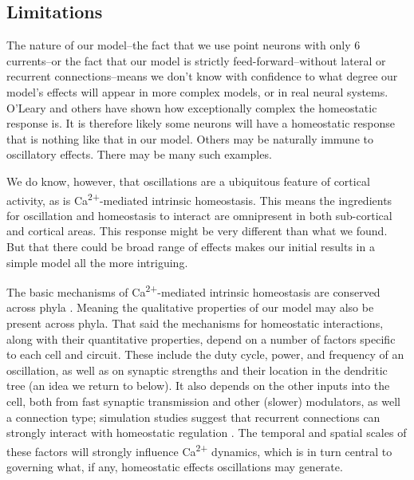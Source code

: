 \documentclass{article}
\begin{document}
\subsection*{Limitations}
The nature of our model--the fact that we use point neurons with only 6 currents--or the fact that our model is strictly feed-forward--without lateral or recurrent connections--means we don't know with confidence to what degree our model's effects will appear in more complex models, or in real neural systems. O'Leary \citep{OLeary2014} and others have shown how exceptionally complex the homeostatic response is. It is therefore likely some neurons will have a homeostatic response that is nothing like that in our model. Others may be naturally immune to oscillatory effects. There may be many such examples.

We do know, however, that oscillations are a ubiquitous feature of cortical activity, as is Ca\textsuperscript{2+}-mediated intrinsic homeostasis. This means the ingredients for oscillation and homeostasis to interact are omnipresent in both sub-cortical and cortical areas. This response might be very different than what we found. But that there could be broad range of effects makes our initial results in a simple model all the more intriguing. 

The basic mechanisms of Ca\textsuperscript{2+}-mediated intrinsic homeostasis are conserved across phyla \cite{Tran2017}. Meaning the qualitative properties of our model may also be present across phyla. That said the mechanisms for homeostatic interactions, along with their quantitative properties, depend on a number of factors specific to each cell and circuit. These include the duty cycle, power, and frequency of an oscillation, as well as on synaptic strengths and their location in the dendritic tree (an idea we return to below). It also depends on the other inputs into the cell, both from fast synaptic transmission and other (slower) modulators, as well a connection type; simulation studies suggest that recurrent connections can strongly interact with homeostatic regulation \cite{Harnack2015}. The temporal and spatial scales of these factors will strongly influence Ca\textsuperscript{2+} dynamics, which is in turn central to governing what, if any, homeostatic effects oscillations may generate.
\end{document}
